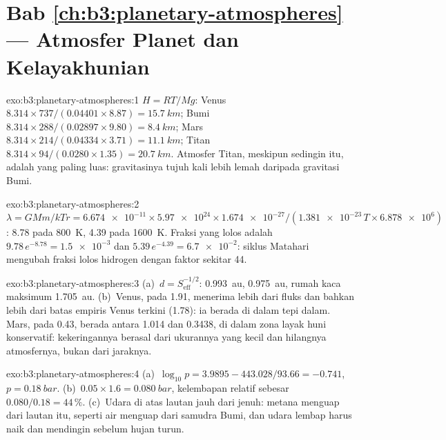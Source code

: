 \section*{Bab \ref{ch:b3:planetary-atmospheres} --- Atmosfer Planet dan Kelayakhunian}

\begin{solution}{exo:b3:planetary-atmospheres:1}
$H = RT/Mg$: Venus $8.314\times737/(0.04401\times8.87) = \qty{15.7}{km}$;
Bumi $8.314\times288/(0.02897\times9.80) = \qty{8.4}{km}$; Mars
$8.314\times214/(0.04334\times3.71) = \qty{11.1}{km}$; Titan
$8.314\times94/(0.0280\times1.35) = \qty{20.7}{km}$. Atmosfer Titan,
meskipun sedingin itu, adalah yang paling luas: gravitasinya tujuh kali lebih lemah
daripada gravitasi Bumi.
\end{solution}

\begin{solution}{exo:b3:planetary-atmospheres:2}
$\lambda = GMm/kTr = \num{6.674e-11}\times\num{5.97e24}\times\num{1.674e-27}
/(\num{1.381e-23}\,T\times\num{6.878e6})$: 8.78 pada \qty{800}{K}, 4.39 pada
\qty{1600}{K}. Fraksi yang lolos adalah $9.78\,e^{-8.78} =
\num{1.5e-3}$ dan $5.39\,e^{-4.39} = \num{6.7e-2}$: siklus Matahari
mengubah fraksi lolos hidrogen dengan faktor sekitar 44.
\end{solution}

\begin{solution}{exo:b3:planetary-atmospheres:3}
(a)~$d = S_\mathrm{eff}^{-1/2}$:  \qty{0.993}{au}, 
\qty{0.975}{au}, rumah kaca maksimum \qty{1.705}{au}. (b)~Venus, pada 1.91,
menerima lebih dari fluks  dan bahkan lebih dari batas empiris
Venus terkini (1.78): ia berada di dalam tepi dalam. Mars, pada 0.43,
berada antara 1.014 dan 0.3438, di dalam zona layak huni konservatif:
kekeringannya berasal dari ukurannya yang kecil dan hilangnya atmosfernya, bukan
dari jaraknya.
\end{solution}

\begin{solution}{exo:b3:planetary-atmospheres:4}
(a)~$\log_{10}p = 3.9895 - 443.028/93.66 = -0.741$, $p =
\qty{0.18}{bar}$. (b)~$0.05\times1.6 = \qty{0.080}{bar}$, kelembapan
relatif sebesar $0.080/0.18 = 44\,\%$. (c)~Udara di atas lautan jauh dari
jenuh: metana menguap dari lautan itu, seperti air menguap dari
samudra Bumi, dan udara lembap harus naik dan mendingin sebelum hujan turun.
\end{solution}

